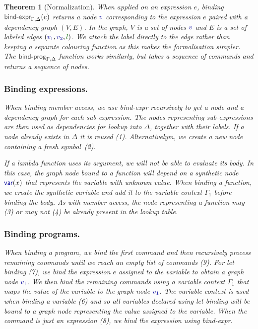 \documentclass[acmsmall,anonymous,fleqn]{acmart}\settopmatter{printfolios=false,printccs=false,printacmref=false}
\newcounter{thc}
\theoremstyle{plain}
\newtheorem{theorem}[thc]{Theorem}
\theoremstyle{definition}
\newcommand{\ident}[1]{\textnormal{\textcolor{idclr}{\sffamily #1}}}
\newcommand{\kvd}[1]{\textnormal{\textcolor{kvdclr}{\sffamily #1}}}
\newcommand{\bndclr}[1]{\textcolor{kvdclr}{#1}}
\newcommand{\blblclr}[1]{\textcolor{numclr}{#1}}
\newcommand{\bnd}[1]{\textnormal{\textcolor{kvdclr}{\sffamily #1}}}
\begin{document}
\begin{theorem}[Normalization]
When applied on an expression $e$, binding $\ident{bind-expr}_{\Gamma,\Delta}(e)$ returns
a node $\bndclr{v}$ corresponding to the expression $e$ paired with a dependency graph $(V, E)$.
In the graph, $V$ is a set of nodes $\bndclr{v}$ and $E$ is a set of labeled edges
$(\bndclr{v_1}, \bndclr{v_2}, \blblclr{l})$. We attach the label directly to the edge rather than
keeping a separate colouring function as this makes the formalisation simpler.
The $\ident{bind-prog}_{\Gamma,\Delta}$ function works similarly, but takes a sequence of
commands and returns a sequence of nodes.

\subsubsection{Binding expressions.} When binding member access, we use \ident{bind-expr} recursively
to get a node and a dependency graph for each sub-expression. The nodes representing sub-expressions are
then used as dependencies for lookup into $\Delta$, together with their labels. If a node already
exists in $\Delta$ it is reused (1). Alternativelym, we create a new node containing a fresh symbol~(2).

If a lambda function uses its argument, we will not be able to evaluate its body. In this case, the
graph node bound to a function will depend on a synthetic node $\bnd{var}(x)$ that represents the
variable with unknown value. When binding a function, we create the synthetic variable and add it
to the variable context $\Gamma_1$ before binding the body. As with member access, the node
representing a function may (3) or may not (4) be already present in the lookup table.

\subsubsection{Binding programs.} When binding a program, we bind the first command and then
recursively process remaining commands until we reach an empty list of commands (9).
For \kvd{let} binding (7), we bind the expression $e$ assigned to the variable to obtain a
graph node $\bndclr{v_1}$. We then bind the remaining commands using a variable context $\Gamma_1$
that maps the value of the variable to the graph node $\bndclr{v_1}$. The variable context is used
when binding a variable (6) and so all variables declared using \kvd{let} binding will be bound to
a graph node representing the value assigned to the variable. When the command is just an
expression (8), we bind the expression using \ident{bind-expr}.


\end{theorem}
\end{document}
